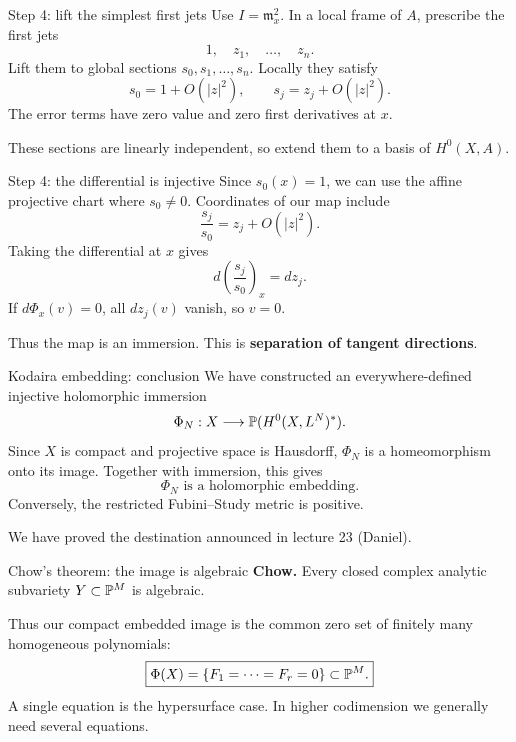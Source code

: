 \begin{frame}{Step 4: lift the simplest first jets}
Use \(I=\mathfrak m_x^2\). In a local frame of \(A\), prescribe the first jets
\[
1,\quad z_1,\quad\ldots,\quad z_n.
\]
Lift them to global sections \(s_0,s_1,\ldots,s_n\). Locally they satisfy
\[
s_0=1+O(|z|^2),\qquad s_j=z_j+O(|z|^2).
\]
The error terms have zero value and zero first derivatives at \(x\).
\par\medskip
These sections are linearly independent, so extend them to a basis of \(H^0(X,A)\).
\end{frame}

\begin{frame}{Step 4: the differential is injective}
Since \(s_0(x)=1\), we can use the affine projective chart where \(s_0\ne0\).
Coordinates of our map include
\[
\frac{s_j}{s_0}=z_j+O(|z|^2).
\]
Taking the differential at \(x\) gives
\[
d\!\left(\frac{s_j}{s_0}\right)_x=dz_j.
\]
If \(d\Phi_x(v)=0\), all \(dz_j(v)\) vanish, so \(v=0\).
\par\medskip
Thus the map is an immersion. This is \textbf{separation of tangent directions}.
\end{frame}

\begin{frame}{Kodaira embedding: conclusion}
We have constructed an everywhere-defined injective holomorphic immersion
\[
\Phi_N:X\longrightarrow\mathbb P(H^0(X,L^N)^*).
\]
Since \(X\) is compact and projective space is Hausdorff, \(\Phi_N\) is a homeomorphism onto its image. Together with immersion, this gives
\[
\boxed{\Phi_N\text{ is a holomorphic embedding}.}
\]
Conversely, the restricted Fubini--Study metric is positive.
\par\medskip
We have proved the destination announced in lecture 23 (Daniel).
\end{frame}

\begin{frame}{Chow's theorem: the image is algebraic}
\textbf{Chow.} Every closed complex analytic subvariety \(Y\subset\mathbb P^M\) is algebraic.
\par\bigskip
Thus our compact embedded image is the common zero set of finitely many homogeneous polynomials:
\[
\boxed{\Phi(X)=\{F_1=\cdots=F_r=0\}\subset\mathbb P^M.}
\]
A single equation is the hypersurface case. In higher codimension we generally need several equations.
\end{frame}


